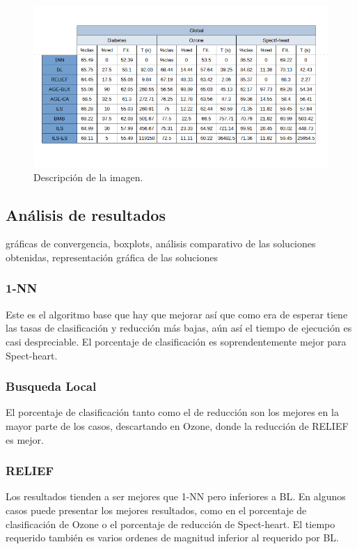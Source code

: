 \documentclass[12pt, spanish]{article}
\begin{document}
\begin{figure}[htbp]
  \centering
  \includegraphics[width=\textwidth]{tables3.png}
  \caption{Descripción de la imagen.}
  \label{fig:imagen}
\end{figure}


\pagebreak
\subsection{Análisis de resultados}
gráficas de convergencia, boxplots, análisis comparativo de las soluciones obtenidas, representación gráfica de las soluciones
\subsubsection{1-NN}
Este es el algoritmo base que hay que mejorar así que como era de esperar tiene las tasas de clasificación y reducción más bajas, aún así el tiempo de ejecución es casi despreciable. El porcentaje de clasificación es soprendentemente mejor para Spect-heart.
\subsubsection{Busqueda Local}
El porcentaje de clasificación tanto como el de reducción son los mejores en la mayor parte de los casos, descartando en Ozone, donde la reducción de RELIEF es mejor. 

\subsubsection{RELIEF}
Los resultados tienden a ser mejores que 1-NN pero inferiores a BL. En algunos casos puede presentar los mejores resultados, como en el porcentaje de clasificación de Ozone o el porcentaje de reducción de Spect-heart. El tiempo requerido también es varios ordenes de magnitud inferior al requerido por BL. 
\end{document}

